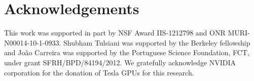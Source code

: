 \section*{Acknowledgements}
This work was supported in part by NSF Award IIS-1212798 and ONR MURI-N00014-10-1-0933. Shubham Tulsiani was supported by the Berkeley fellowship and Jo\~{a}o Carreira was supported by the Portuguese Science Foundation, FCT, under grant SFRH/BPD/84194/2012. We gratefully acknowledge NVIDIA corporation for the donation of Tesla GPUs for this research.
